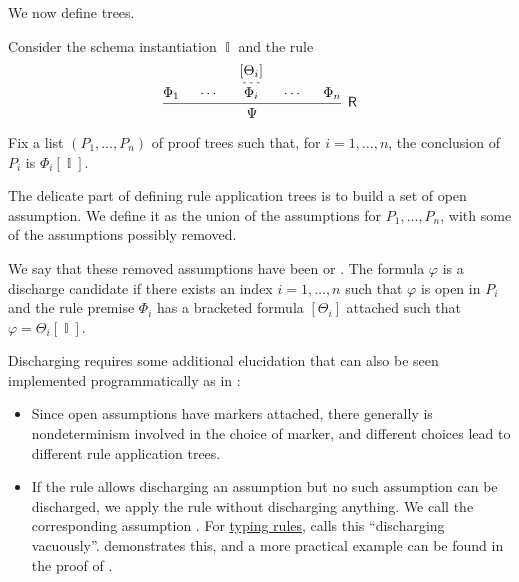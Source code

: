 \begin{definition}
\begin{thmenum}[resume=def:natural_deduction_proof_tree]
     We now define  trees.

    Consider the schema instantiation \( \BbbI \) and the rule
    \begin{equation*}
      \begin{prooftree}
        \hypo{ \Phi_1 }
        \hypo{ \cdots }

        \hypo{ [\Theta_i] }
        \infer[dashed]1{ \Phi_i }

        \hypo{ \cdots }
        \hypo{ \Phi_n }
        \infer5[\logic{R}]{ \Psi }
      \end{prooftree}
    \end{equation*}

    Fix a list \( (P_1, \ldots, P_n) \) of proof trees such that, for \( i = 1, \ldots, n \), the conclusion of \( P_i \) is \( \Phi_i[\BbbI] \).

    The delicate part of defining rule application trees is to build a set of open assumption. We define it as the union of the assumptions for \( P_1, \ldots, P_n \), with some of the assumptions possibly removed.

    We say that these removed assumptions have been  or . The formula \( \varphi \) is a discharge candidate if there exists an index \( i = 1, \ldots, n \) such that \( \varphi \) is open in \( P_i \) and the rule premise \( \Phi_i \) has a bracketed formula \( [\Theta_i] \) attached such that \( \varphi = \Theta_i[\BbbI] \).

    Discharging requires some additional elucidation that can also be seen implemented programmatically as  in \cite{notebook:code}:
    \begin{itemize}
      \item Since open assumptions have markers attached, there generally is nondeterminism involved in the choice of marker, and different choices lead to different rule application trees.

      \item If the rule allows discharging an assumption but no such assumption can be discharged, we apply the rule without discharging anything. We call the corresponding assumption . For \hyperref[con:typing_rule]{typing rules},  calls this \enquote{discharging vacuously}.  demonstrates this, and a more practical example can be found in the proof of .


\end{itemize}
\end{thmenum}
\end{definition}
